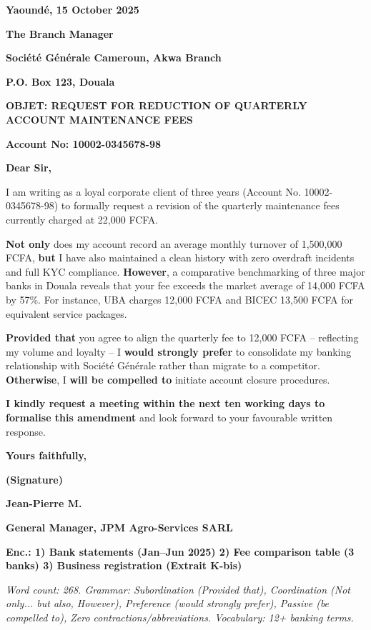 \documentclass[11pt]{article}
\begin{document}
\begin{corrige}
\textbf{Yaoundé, 15 October 2025}\par
\textbf{The Branch Manager}\par
\textbf{Société Générale Cameroun, Akwa Branch}\par
\textbf{P.O. Box 123, Douala}\par
\vspace{0.3cm}
\textbf{OBJET: REQUEST FOR REDUCTION OF QUARTERLY ACCOUNT MAINTENANCE FEES}\par
\textbf{Account No: 10002-0345678-98}\par
\vspace{0.3cm}
\textbf{Dear Sir,}\par
I am writing as a loyal corporate client of three years (Account No. 10002-0345678-98) to formally request a revision of the quarterly maintenance fees currently charged at 22,000 FCFA.\par
\textbf{Not only} does my account record an average monthly turnover of 1,500,000 FCFA, \textbf{but} I have also maintained a clean history with zero overdraft incidents and full KYC compliance. \textbf{However}, a comparative benchmarking of three major banks in Douala reveals that your fee exceeds the market average of 14,000 FCFA by 57\%. For instance, UBA charges 12,000 FCFA and BICEC 13,500 FCFA for equivalent service packages.\par
\textbf{Provided that} you agree to align the quarterly fee to 12,000 FCFA -- reflecting my volume and loyalty -- I \textbf{would strongly prefer} to consolidate my banking relationship with Société Générale rather than migrate to a competitor. \textbf{Otherwise}, I \textbf{will be compelled to} initiate account closure procedures.\par
\textbf{I kindly request a meeting within the next ten working days to formalise this amendment} and look forward to your favourable written response.\par
\vspace{0.3cm}
\textbf{Yours faithfully,}\par
\vspace{1cm}
\textbf{(Signature)}\par
\textbf{Jean-Pierre M.}\par
\textbf{General Manager, JPM Agro-Services SARL}\par
\vspace{0.3cm}
\textbf{Enc.: 1) Bank statements (Jan--Jun 2025)  2) Fee comparison table (3 banks)  3) Business registration (Extrait K-bis)}\par
\vspace{0.2cm}
\textit{Word count: 268. Grammar: Subordination (Provided that), Coordination (Not only... but also, However), Preference (would strongly prefer), Passive (be compelled to), Zero contractions/abbreviations. Vocabulary: 12+ banking terms.}
\end{corrige}
\end{document}
